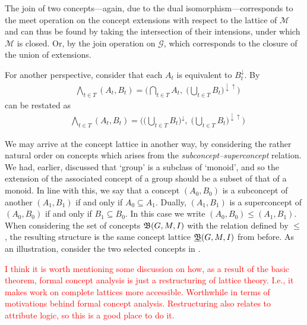 The join of two concepts---again, due to the dual isomorphism---corresponds to
the meet operation on the concept extensions with respect to the lattice of
$\mathcal{M}$ and can thus be found by taking the intersection of their
intensions, under which $\mathcal{M}$ is closed. Or, by the join operation on $\mathcal{G}$,
which corresponds to the closure of the union of extensions.

For another perspective, consider that each $A_{t}$ is equivalent to $B_{t}^{\downarrow}$.
By 
\begin{align*}
	 & \underset{t \in T}\bigwedge (A_{t}, B_{t}) = \Big( \underset{t \in T}\bigcap A_{t}, \; \big(\underset{t \in T}\bigcup B_{t}\big)^{\downarrow \uparrow}\Big)
\end{align*}
can be restated as
\begin{align*}
	 & \underset{t \in T}\bigwedge (A_{t}, B_{t}) = \Big(\big(\underset{t \in T}\bigcup B_{t}\big)^{\downarrow}, \; \big(\underset{t \in T}\bigcup B_{t}\big)^{\downarrow \uparrow}\Big)
\end{align*}

We may arrive at the concept lattice in another way, by considering the rather
natural order on concepts which arises from the \textit{subconcept--superconcept}
relation. We had, earlier, discussed that `group' is a subclass of `monoid', and
so the extension of the associated concept of a group should be a subset of that
of a monoid. In line with this, we say that a concept $(A_{0},B_{0})$ is a subconcept
of another $(A_{1},B_{1})$ if and only if $A_{0}\subseteq A_{1}$. Dually, $(A_{1}
	,B_{1})$ is a superconcept of $(A_{0},B_{0})$ if and only if $B_{1}\subseteq B_{0}$.
In this case we write $(A_{0},B_{0}) \leq (A_{1},B_{1})$. When considering the set
of concepts ${\mathfrak B} (G,M,\mathrel{I})$ with the relation defined by $\leq$, the resulting structure
is the same concept lattice $\underline{{\mathfrak B}} (G,M,\mathrel{I})$ from before. As an illustration, consider
the two selected concepts in .

\textcolor{red}{I think it is worth mentioning some discussion on how, as a result
	of the basic theorem, formal concept analysis is just a restructuring of lattice
	theory. I.e., it makes work on complete lattices more accessible. Worthwhile in
	terms of motivations behind formal concept analysis. Restructuring also relates to
	attribute logic, so this is a good place to do it. }

